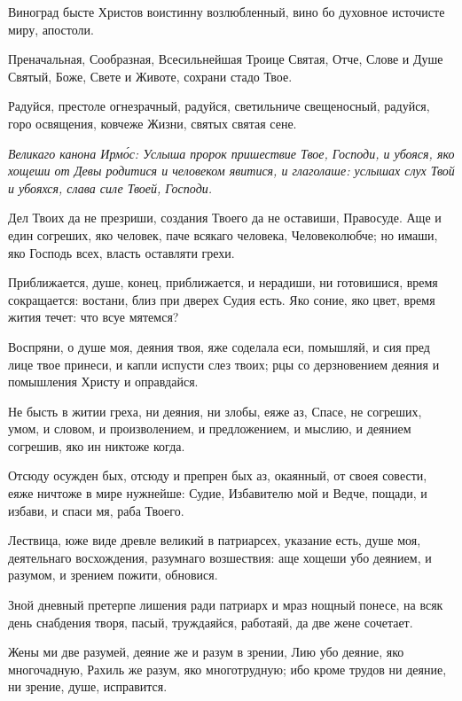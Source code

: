 
Виноград бысте Христов воистинну возлюбленный, вино бо духовное источисте миру, апостоли.


Преначальная, Сообразная, Всесильнейшая Троице Святая, Отче, Слове и Душе Святый, Боже, Свете и Животе, сохрани стадо Твое.


Радуйся, престоле огнезрачный, радуйся, светильниче свещеносный, радуйся, горо освящения, ковчеже Жизни, святых святая сене.

\itshape Великаго канона Ирм\'{о}с\normalfont{}: Услыша пророк пришествие Твое, Господи, и убояся, яко хощеши от Девы родитися и человеком явитися, и глаголаше: услышах слух Твой и убояхся, слава силе Твоей, Господи.

Дел Твоих да не презриши, создания Твоего да не оставиши, Правосуде. Аще и един согреших, яко человек, паче всякаго человека, Человеколюбче; но имаши, яко Господь всех, власть оставляти грехи.

Приближается, душе, конец, приближается, и нерадиши, ни готовишися, время сокращается: востани, близ при дверех Судия есть. Яко соние, яко цвет, время жития течет: что всуе мятемся?

Воспряни, о душе моя, деяния твоя, яже соделала еси, помышляй, и сия пред лице твое принеси, и капли испусти слез твоих; рцы со дерзновением деяния и помышления Христу и оправдайся.

Не бысть в житии греха, ни деяния, ни злобы, еяже аз, Спасе, не согреших, умом, и словом, и произволением, и предложением, и мыслию, и деянием согрешив, яко ин никтоже когда.

Отсюду осужден бых, отсюду и препрен бых аз, окаянный, от своея совести, еяже ничтоже в мире нужнейше: Судие, Избавителю мой и Ведче, пощади, и избави, и спаси мя, раба Твоего.

Лествица, юже виде древле великий в патриарсех, указание есть, душе моя, деятельнаго восхождения, разумнаго возшествия: аще хощеши убо деянием, и разумом, и зрением пожити, обновися.

Зной дневный претерпе лишения ради патриарх и мраз нощный понесе, на всяк день снабдения творя, пасый, труждаяйся, работаяй, да две жене сочетает.

Жены ми две разумей, деяние же и разум в зрении, Лию убо деяние, яко многочадную, Рахиль же разум, яко многотрудную; ибо кроме трудов ни деяние, ни зрение, душе, исправится.

